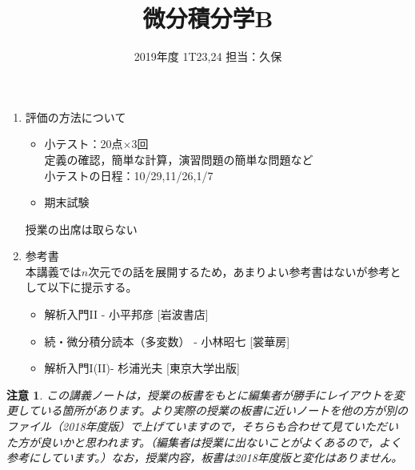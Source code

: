 \documentclass[dvipdfmx,a4j,10pt]{jsarticle}
\title{微分積分学B}
\author{2019年度 1T23,24 担当：久保}
\date{}
\theoremstyle{mystyle1}
\theoremstyle{mystyle2}
\newtheorem{note}{注意}
\begin{document}
\maketitle

\begin{enumerate}
\item 評価の方法について
	\begin{itemize}
		\item 小テスト：20点$\times$3回\\
			定義の確認，簡単な計算，演習問題の簡単な問題など\\
			小テストの日程：10/29,11/26,1/7
		\item 期末試験
	\end{itemize}
	授業の出席は取らない
\item 参考書\\
本講義では$n$次元での話を展開するため，あまりよい参考書はないが参考として以下に提示する。
	\begin{itemize}
		\item 解析入門II - 小平邦彦 [岩波書店]
		\item 続・微分積分読本（多変数） - 小林昭七 [裳華房]
		\item 解析入門I(II)- 杉浦光夫 [東京大学出版]
	\end{itemize}
\end{enumerate}

\begin{note}
	この講義ノートは，授業の板書をもとに編集者が勝手にレイアウトを変更している箇所があります。より実際の授業の板書に近いノートを他の方が別のファイル（2018年度版）で上げていますので，そちらも合わせて見ていただいた方が良いかと思われます。（編集者は授業に出ないことがよくあるので，よく参考にしています。）なお，授業内容，板書は2018年度版と変化はありません。
\end{note}

\newpage

\tableofcontents


%
%
%


%
%
%
%


%
%
%
%
%
\end{document}
